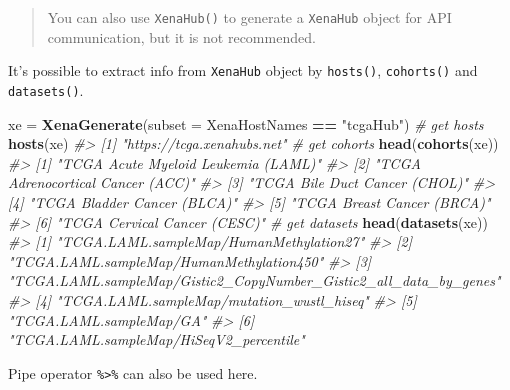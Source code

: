 \documentclass[nofonts,]{tufte-handout}
\newenvironment{Shaded}{\begin{snugshade}}{\end{snugshade}}
\newcommand{\CommentTok}[1]{\textcolor[rgb]{0.56,0.35,0.01}{\textit{#1}}}
\newcommand{\DataTypeTok}[1]{\textcolor[rgb]{0.13,0.29,0.53}{#1}}
\newcommand{\KeywordTok}[1]{\textcolor[rgb]{0.13,0.29,0.53}{\textbf{#1}}}
\newcommand{\NormalTok}[1]{#1}
\newcommand{\OperatorTok}[1]{\textcolor[rgb]{0.81,0.36,0.00}{\textbf{#1}}}
\newcommand{\StringTok}[1]{\textcolor[rgb]{0.31,0.60,0.02}{#1}}
\begin{document}
\begin{quote}
You can also use \texttt{XenaHub()} to generate a \texttt{XenaHub}
object for API communication, but it is not recommended.
\end{quote}

It's possible to extract info from \texttt{XenaHub} object by
\texttt{hosts()}, \texttt{cohorts()} and \texttt{datasets()}.

\begin{Shaded}
\begin{Highlighting}[]
\NormalTok{xe =}\StringTok{ }\KeywordTok{XenaGenerate}\NormalTok{(}\DataTypeTok{subset =}\NormalTok{ XenaHostNames }\OperatorTok{==}\StringTok{ "tcgaHub"}\NormalTok{)}
\CommentTok{# get hosts}
\KeywordTok{hosts}\NormalTok{(xe)}
\CommentTok{#> [1] "https://tcga.xenahubs.net"}
\CommentTok{# get cohorts}
\KeywordTok{head}\NormalTok{(}\KeywordTok{cohorts}\NormalTok{(xe))}
\CommentTok{#> [1] "TCGA Acute Myeloid Leukemia (LAML)"}
\CommentTok{#> [2] "TCGA Adrenocortical Cancer (ACC)"  }
\CommentTok{#> [3] "TCGA Bile Duct Cancer (CHOL)"      }
\CommentTok{#> [4] "TCGA Bladder Cancer (BLCA)"        }
\CommentTok{#> [5] "TCGA Breast Cancer (BRCA)"         }
\CommentTok{#> [6] "TCGA Cervical Cancer (CESC)"}
\CommentTok{# get datasets}
\KeywordTok{head}\NormalTok{(}\KeywordTok{datasets}\NormalTok{(xe))}
\CommentTok{#> [1] "TCGA.LAML.sampleMap/HumanMethylation27"                          }
\CommentTok{#> [2] "TCGA.LAML.sampleMap/HumanMethylation450"                         }
\CommentTok{#> [3] "TCGA.LAML.sampleMap/Gistic2_CopyNumber_Gistic2_all_data_by_genes"}
\CommentTok{#> [4] "TCGA.LAML.sampleMap/mutation_wustl_hiseq"                        }
\CommentTok{#> [5] "TCGA.LAML.sampleMap/GA"                                          }
\CommentTok{#> [6] "TCGA.LAML.sampleMap/HiSeqV2_percentile"}
\end{Highlighting}
\end{Shaded}

Pipe operator \texttt{\%\textgreater{}\%} can also be used here.

\begin{Shaded}
\end{Shaded}
\end{document}
